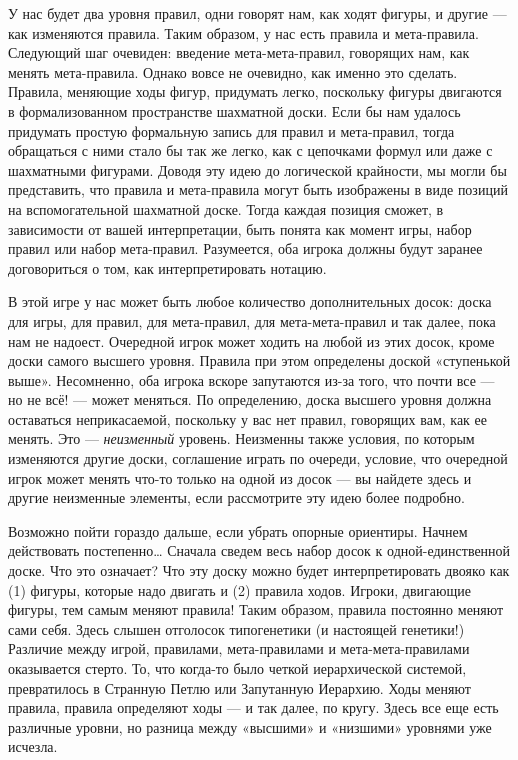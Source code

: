 \documentclass[../main.tex]{subfiles}
\begin{document}
У нас будет два уровня правил, одни говорят нам, как ходят фигуры, и другие --- как изменяются правила. Таким образом, у нас есть правила и мета-правила. Следующий шаг очевиден: введение мета-мета-правил, говорящих нам, как менять мета-правила. Однако вовсе не очевидно, как именно это сделать. Правила, меняющие ходы фигур, придумать легко, поскольку фигуры двигаются в формализованном пространстве шахматной доски. Если бы нам удалось придумать простую формальную запись для правил и мета-правил, тогда обращаться с ними стало бы так же легко, как с цепочками формул или даже с шахматными фигурами. Доводя эту идею до логической крайности, мы могли бы представить, что правила и мета-правила могут быть изображены в виде позиций на вспомогательной шахматной доске. Тогда каждая позиция сможет, в зависимости от вашей интерпретации, быть понята как момент игры, набор правил или набор мета-правил. Разумеется, оба игрока должны будут заранее договориться о том, как интерпретировать нотацию.

В этой игре у нас может быть любое количество дополнительных досок: доска для игры, для правил, для мета-правил, для мета-мета-правил и так далее, пока нам не надоест. Очередной игрок может ходить на любой из этих досок, кроме доски самого высшего уровня. Правила при этом определены доской «ступенькой выше». Несомненно, оба игрока вскоре запутаются из-за того, что почти все --- но не всё! --- может меняться. По определению, доска высшего уровня должна оставаться неприкасаемой, поскольку у вас нет правил, говорящих вам, как ее менять. Это --- \emph{неизменный} уровень. Неизменны также условия, по которым изменяются другие доски, соглашение играть по очереди, условие, что очередной игрок может менять что-то только на одной из досок --- вы найдете здесь и другие неизменные элементы, если рассмотрите эту идею более подробно.

Возможно пойти гораздо дальше, если убрать опорные ориентиры. Начнем действовать постепенно\ldots{} Сначала сведем весь набор досок к одной-единственной доске. Что это означает? Что эту доску можно будет интерпретировать двояко как (1) фигуры, которые надо двигать и (2) правила ходов. Игроки, двигающие фигуры, тем самым меняют правила! Таким образом, правила постоянно меняют сами себя. Здесь слышен отголосок типогенетики (и настоящей генетики!) Различие между игрой, правилами, мета-правилами и мета-мета-правилами оказывается стерто. То, что когда-то было четкой иерархической системой, превратилось в Странную Петлю или Запутанную Иерархию. Ходы меняют правила, правила определяют ходы --- и так далее, по кругу. Здесь все еще есть различные уровни, но разница между «высшими» и «низшими» уровнями уже исчезла.
\end{document}
